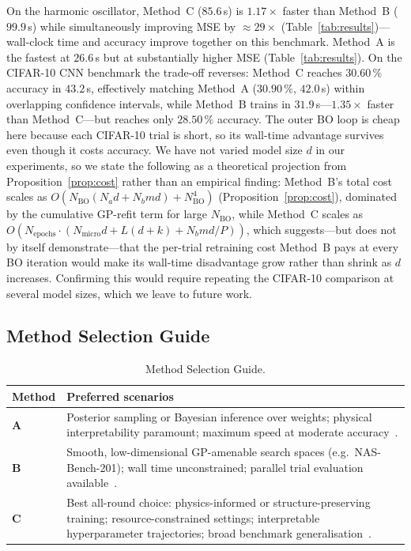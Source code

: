 \documentclass[11pt]{article}
\theoremstyle{definition}
\begin{document}
On the harmonic oscillator, Method~C ($85.6$\,s) is $1.17\times$
faster than Method~B ($99.9$\,s) while simultaneously improving MSE
by $\approx29\times$ (Table~\ref{tab:results})---wall-clock time and
accuracy improve together on this benchmark. Method~A is the fastest
at $26.6$\,s but at substantially higher MSE
(Table~\ref{tab:results}). On the CIFAR-10 CNN benchmark the
trade-off reverses: Method~C reaches $30.60\,\%$ accuracy in
$43.2$\,s, effectively matching Method~A ($30.90\,\%$, $42.0$\,s)
within overlapping confidence intervals,
while Method~B trains in $31.9$\,s---$1.35\times$ faster than
Method~C---but reaches only $28.50\,\%$ accuracy. The outer BO loop
is cheap here because each CIFAR-10 trial is short, so its wall-time
advantage survives even though it costs accuracy. We have not varied
model size $d$ in our experiments, so we state the following as a
theoretical projection from Proposition~\ref{prop:cost} rather than
an empirical finding: Method~B's total cost scales as
$O\!\left(N_{\mathrm{BO}}(N_a d + N_b md) + N_{\mathrm{BO}}^4\right)$
(Proposition~\ref{prop:cost}), dominated by the cumulative
GP-refit term for large $N_{\mathrm{BO}}$, while Method~C
scales as
$O(N_{\mathrm{epochs}}\cdot(N_{\mathrm{micro}}d+L(d+k)+N_b md/P))$,
which suggests---but does not by itself demonstrate---that the
per-trial retraining cost Method~B pays at every BO iteration would
make its wall-time disadvantage grow rather than shrink as $d$
increases. Confirming this would require repeating the CIFAR-10
comparison at several model sizes, which we leave to future work.

\subsection{Method Selection Guide}

\begin{table}[H]
\centering
\caption{Method Selection Guide.}
\label{tab:guide}
\renewcommand{\arraystretch}{1.35}
\begin{tabular}{p{1.6cm}p{5.8cm}}
\toprule
\textbf{Method} & \textbf{Preferred scenarios} \\
\midrule
\textbf{A} & Posterior sampling or Bayesian inference over
weights; physical interpretability paramount; maximum
speed at moderate accuracy~\cite{betancourt2017}. \\
\midrule
\textbf{B} & Smooth, low-dimensional GP-amenable search spaces
(e.g.~NAS-Bench-201); wall time unconstrained; parallel
trial evaluation available~\cite{snoek2012}. \\
\midrule
\textbf{C} & Best all-round choice: physics-informed or
structure-preserving training; resource-constrained
settings; interpretable hyperparameter trajectories;
broad benchmark generalisation~\cite{kiyani2025}. \\
\bottomrule
\end{tabular}
\end{table}
\end{document}
